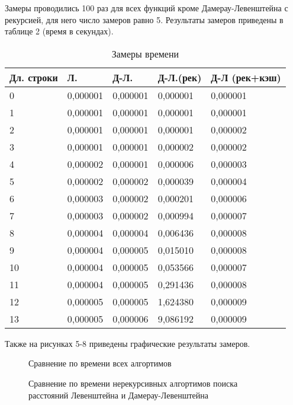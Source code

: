 Замеры проводились 100 раз для всех функций кроме Дамерау-Левенштейна с рекурсией, для него число замеров равно 5.
Результаты замеров приведены в таблице 2 (время в секундах).
\pagebreak
\begin{table}[!h]
	\captionsetup{justification=centering}
    \caption{Замеры времени}
    \centering
    \begin{tabular}{|l|l|l|l|l|}
    \hline
        Дл. строки & Л. & Д-Л. & Д-Л.(рек) & Д-Л (рек+кэш) \\ \hline
        0 & 0,000001 & 0,000001 & 0,000001 & 0,000001 \\ \hline
        1 & 0,000001 & 0,000001 & 0,000001 & 0,000001 \\ \hline
        2 & 0,000001 & 0,000001 & 0,000001 & 0,000002 \\ \hline
        3 & 0,000001 & 0,000001 & 0,000002 & 0,000002 \\ \hline
        4 & 0,000002 & 0,000001 & 0,000006 & 0,000003 \\ \hline
        5 & 0,000002 & 0,000002 & 0,000039 & 0,000004 \\ \hline
        6 & 0,000003 & 0,000002 & 0,000201 & 0,000006 \\ \hline
        7 & 0,000003 & 0,000002 & 0,000994 & 0,000007 \\ \hline
        8 & 0,000004 & 0,000004 & 0,006436 & 0,000008 \\ \hline
        9 & 0,000004 & 0,000005 & 0,015010 & 0,000008 \\ \hline
        10 & 0,000004 & 0,000005 & 0,053566 & 0,000007 \\ \hline
        11 & 0,000004 & 0,000005 & 0,291436 & 0,000008 \\ \hline
        12 & 0,000005 & 0,000005 & 1,624380 & 0,000009 \\ \hline
        13 & 0,000005 & 0,000006 & 9,086192 & 0,000009 \\ \hline
    \end{tabular}
\end{table}

Также на рисунках 5-8 приведены графические результаты замеров.

\begin{figure}[!h]
	\centering
	\captionsetup{justification=centering}
    \def\svgscale{0.45}
	
	\caption{Сравнение по времени всех алгортимов}
	\label{fig:r1}
\end{figure}

\begin{figure}[!h]
	\centering
	\captionsetup{justification=centering}
    \def\svgscale{0.5}
	
	\caption{Сравнение по времени нерекурсивных алгортимов поиска расстояний Левенштейна и Дамерау-Левенштейна}
	\label{fig:r2}
\end{figure}

